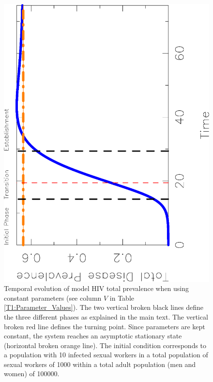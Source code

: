 \documentclass[preprint,12pt]{elsarticle}
\begin{document}
\begin{figure}
\centering 
\includegraphics[scale=0.6,angle=270]{Sigmoidal_Curve.pdf}
\caption{Temporal evolution of model HIV total prevalence when using constant parameters (see column $V$ in Table \ref{T1:Parameter_Values}). The two vertical broken black lines define the three different phases as explained in the main text. The vertical broken red line defines the turning point. Since parameters are kept constant, the system reaches an asymptotic stationary state (horizontal broken orange line). The initial condition corresponds to a population with 10 infected sexual workers in a total population of sexual workers of 1000 within a total adult population (men and women) of 100000.}
\label{Fig2:Sigmoidal}
\end{figure}
\end{document}
